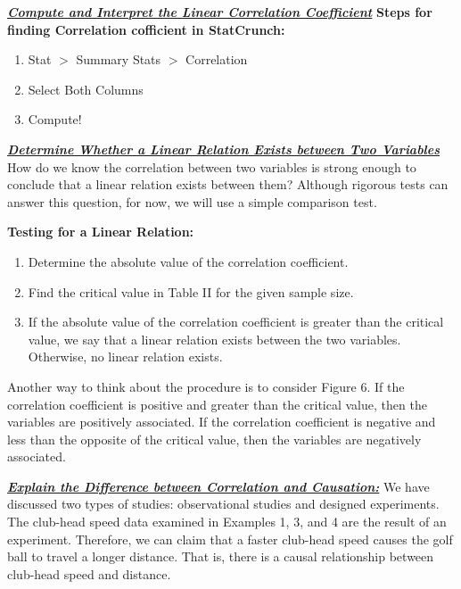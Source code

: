 \documentclass{report}
\begin{document}
     \pagebreak \bigbreak \noindent
     \textbf{\textit{\underline{ Compute and Interpret the Linear Correlation Coefficient}}}
     \bigbreak \noindent 
     \textbf{Steps for finding Correlation cofficient in StatCrunch:}
     \bigbreak \noindent 
     \begin{enumerate}
         \item Stat $> $ Summary Stats $> $ Correlation
        \item Select Both Columns
        \item Compute!
     \end{enumerate}

     \bigbreak \noindent \bigbreak \noindent 
     \textbf{\textit{\underline{Determine Whether a Linear Relation Exists between Two Variables}}}
     \bigbreak \noindent 
     How do we know the correlation between two variables is strong enough to conclude that a linear relation exists between them? Although rigorous tests can answer this question, for now, we will use a simple comparison test.

    \bigbreak \noindent 
    \textbf{Testing for a Linear Relation:}
    \bigbreak \noindent 
    \begin{enumerate}
        \item Determine the absolute value of the correlation coefficient.
        \item Find the critical value in Table II for the given sample size.
        \item If the absolute value of the correlation coefficient is greater than the critical value, we say that a linear relation exists between the two variables. Otherwise, no linear relation exists.
    \end{enumerate}
    \bigbreak \noindent 
    Another way to think about the procedure is to consider Figure 6. If the correlation coefficient is positive and greater than the critical value, then the variables are positively associated. If the correlation coefficient is negative and less than the opposite of the critical value, then the variables are negatively associated.
    \bigbreak \noindent 
    
    \begin{figure}[ht]
        \centering
        \label{fig:figaro}
    \end{figure}

    \bigbreak \noindent \bigbreak \noindent 
    \textbf{\textit{\underline{Explain the Difference between Correlation and Causation:}}}
    \bigbreak \noindent 
    We have discussed two types of studies: observational studies and designed experiments.
    \bigbreak \noindent 
    The club-head speed data examined in Examples 1, 3, and 4 are the result of an experiment. Therefore, we can claim that a faster club-head speed causes the golf ball to travel a longer distance. That is, there is a causal relationship between club-head speed and distance.
\end{document}
